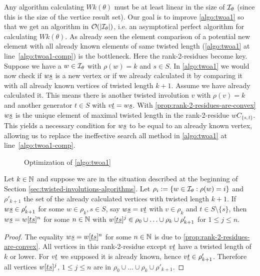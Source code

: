 Any algorithm calculating $Wk(\theta)$ must be at least linear in the size of $\mathcal{I}_{\theta}$ (since this is the size of the vertice result set). Our goal is to improve \ref{algo:twoa1} so that we get an algorithm in $\mathcal{O}(|\mathcal{I}_{\theta}|)$, i.e. an asymptotical perfect algorithm for calculating $Wk(\theta)$. As already seen the element comparison of a potential new element with all already known elements of same twisted length (\ref{algo:twoa1} at line~\ref{algo:twoa1-comp}) is the bottleneck. Here the rank-2-residues become key. Suppose we have a $w \in \mathcal{I}_{\theta}$ with $\rho(w) = k$ and $s \in S$. In \ref{algo:twoa1} we would now check if $w \underline{s}$ is a new vertex or if we already calculated it by comparing it with all already known vertices of twisted length $k + 1$. Assume we have already calculated it. This means there is another twisted involution $v$ with $\rho(v) = k$ and another generator $t \in S$ with $v \underline{t} = w \underline{s}$. With \ref{prop:rank-2-residues-are-convex} $w \underline{s}$ is the unique element of maximal twisted length in the rank-2-residue $wC_{\{s,t\}}$. This yields a necessary condition for $w \underline{s}$ to be equal to an already known vertex, allowing us to replace the ineffective search all method in \ref{algo:twoa1} at line~\ref{algo:twoa1-comp}.

\begin{figure}[ht]
	\centering
	
	\caption{Optimization of \ref{algo:twoa1}}
	\label{fig:optimization-of-twoa1}
\end{figure}

\begin{prop}
	Let $k \in \mathbb{N}$ and suppose we are in the situation described at the beginning of Section \ref{sec:twisted-involutions-algorithms}. Let $\rho_i := \{ w \in \mathcal{I}_{\theta} : \rho(w) = i \}$ and $\rho'_{k+1}$ the set of the already calculated vertices with twisted length $k+1$. If $w \underline{s} \in \rho'_{k+1}$ for some $w \in \rho_k, s \in S$, say $w \underline{s} = v \underline{t}$ with $v \in \rho_k$ and $t \in S \setminus \{s\}$, then $w \underline{s} = w[\underline{t} \underline{s}]^n$ for some $n \in \mathbb{N}$ with $w[\underline{t} \underline{s}]^j \in \rho_0 \cup \ldots \cup \rho_k \cup \rho'_{k+1}$ for $1 \leq j \leq n$.

	\begin{proof}
		The equality $w \underline{s} = w[\underline{t} \underline{s}]^n$ for some $n \in \mathbb{N}$ is due to \ref{prop:rank-2-residues-are-convex}. All vertices in this rank-2-residue except $v \underline{t}$ have a twisted length of $k$ or lower. For $v \underline{t}$ we supposed it is already known, hence $v \underline{t} \in \rho'_{k+1}$. Therefore all vertices $w[\underline{t} \underline{s}]^j$, $1 \leq j \leq n$ are in $\rho_0 \cup \ldots \cup \rho_k \cup \rho'_{k+1}$.
	\end{proof}
\end{prop}

